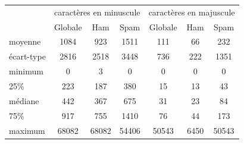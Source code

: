 \documentclass[a4paper,12pt]{article}
\begin{document}
				\begin{table}[H]
					\centering
					\begin{tabular}{|l|c|c|c|c|c|c|}
						\hline
									& \multicolumn{3}{|c|}{caractères en minuscule} & \multicolumn{3}{|c|}{caractères en majuscule}\\
									& Globale	& Ham 	& Spam 	& Globale	& Ham	& Spam	\\
						\hline
						moyenne		& 1084		& 923	& 1511	& 111		& 66		& 232	\\
						\hline
						écart-type	& 2816		& 2518	& 3448	& 736		& 222	& 1351	\\
						\hline
						minimum		& 0			& 3		& 0		& 0			& 0		& 0		\\
						\hline
						25\%			& 223		& 187	& 380	& 15			& 13		& 43		\\
						\hline
						médiane		& 442		& 367	& 675	& 31			& 23		& 84		\\
						\hline
						75\%			& 917		& 755	& 1410	& 76			& 44		& 173	\\
						\hline
						maximum		& 68082		& 68082	& 54406	& 50543		& 6450	& 50543	\\
						\hline
						
					\end{tabular}
				\end{table}
		
		
\end{document}
